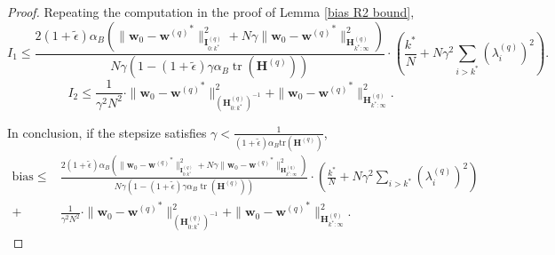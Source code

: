 \documentclass[11pt, letterpaper]{article}
\begin{document}
\begin{proof}
    Repeating the computation in the proof of Lemma \ref{bias R2 bound},
    \begin{equation*}
        I_1\leq\frac{2(1+\tilde{\epsilon})\alpha_B\left(\|\mathbf{w}_0-{\mathbf{w}^{(q)}}^*\|_{\mathbf{I}_{0:k^*}^{(q)}}^2+N\gamma\|\mathbf{w}_0-{\mathbf{w}^{(q)}}^*\|_{\mathbf{H}_{k^*:\infty}^{(q)}}^2\right)}{N\gamma(1-(1+\tilde{\epsilon})\gamma\alpha_B\operatorname{tr}(\mathbf{H}^{(q)}))}\cdot\left(\frac{k^*}{N}+N\gamma^2\sum_{i>k^*}(\lambda_i^{(q)})^2\right).
    \end{equation*}
    \begin{equation*}
        I_2 \leq \frac{1}{\gamma^2N^2}\cdot\|\mathbf{w}_0-{\mathbf{w}^{(q)}}^*\|_{(\mathbf{H}_{0:k^*}^{(q)})^{-1}}^2+\|\mathbf{w}_0-{\mathbf{w}^{(q)}}^*\|_{\mathbf{H}_{{k^*}:\infty}^{(q)}}^2.
    \end{equation*}

    In conclusion, if the stepsize satisfies $\gamma < \frac{1}{(1+\tilde{\epsilon})\alpha_B\mathrm{tr}(\mathbf{H}^{(q)})}$,
    \begin{equation*}
        \begin{aligned}
            \mathrm{bias}\leq & \frac{2(1+\tilde{\epsilon})\alpha_B\left(\|\mathbf{w}_0-{\mathbf{w}^{(q)}}^*\|_{\mathbf{I}_{0:k^*}^{(q)}}^2+N\gamma\|\mathbf{w}_0-{\mathbf{w}^{(q)}}^*\|_{\mathbf{H}_{k^*:\infty}^{(q)}}^2\right)}{N\gamma(1-(1+\tilde{\epsilon})\gamma\alpha_B\operatorname{tr}(\mathbf{H}^{(q)}))}\cdot\left(\frac{k^*}{N}+N\gamma^2\sum_{i>k^*}(\lambda_i^{(q)})^2\right)\\
            +& \frac{1}{\gamma^2N^2}\cdot\|\mathbf{w}_0-{\mathbf{w}^{(q)}}^*\|_{(\mathbf{H}_{0:k^*}^{(q)})^{-1}}^2+\|\mathbf{w}_0-{\mathbf{w}^{(q)}}^*\|_{\mathbf{H}_{k^*:\infty}^{(q)}}^2.
        \end{aligned}
    \end{equation*}
\end{proof}
\end{document}
